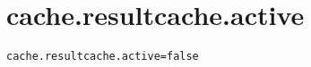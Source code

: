 \section{cache.resultcache.active}
\label{configuration:CacheResultcacheActive}
\AvailableInJavaAndCsharp{\TODO}
\begin{lstlisting}[style=Props,caption={Usage example for \textit{cache.resultcache.active}}]
cache.resultcache.active=false
\end{lstlisting}